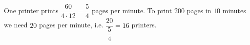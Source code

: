 One printer prints $\dfrac{60}{4\cdot12}=\dfrac54$ pages per minute. To print $200$ pages in $10$ minutes we need $20$ pages per minute, i.e. $\dfrac{20}{\dfrac54}=\boxed{16}$ printers.
